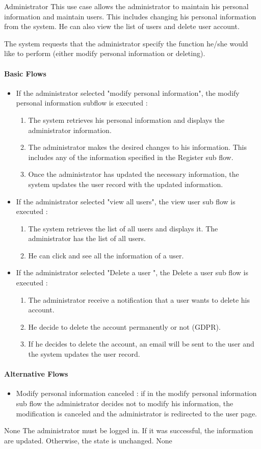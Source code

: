 \subusecasedesc
{Administrator}
{
  This use case allows the administrator to maintain his personal information and maintain users. This includes changing his personal information from the system. He can also view the list of users and delete user account.
}
{
  The system requests that the administrator specify the function he/she would like to perform (either modify personal information or deleting).

  \paragraph{Basic Flows}
  \begin{itemize}
    \item If the administrator selected "modify personal information", the modify personal information subflow is executed :
    \begin{enumerate}
      \item The system retrieves his personal information and displays the administrator information.
      \item The administrator makes the desired changes to his information. This includes any of the information specified in the Register sub flow.
      \item Once the administrator has updated the necessary information, the system updates the user record with the updated information.
    \end{enumerate}
    \item If the administrator selected "view all users", the view user sub flow is executed :
    \begin{enumerate}
      \item The system retrieves the list of all users and displays it. The administrator has the list of all users.
      \item He can click and see all the information of a user.
    \end{enumerate}
    \item If the administrator selected "Delete a user ", the Delete a user sub flow is executed :
    \begin{enumerate}
      \item The administrator receive a notification that a user wants to delete his account.
      \item He decide to delete the account permanently or not (GDPR).
      \item If he decides to delete the account, an email will be sent to the user and the system updates the user record.
    \end{enumerate}

  \end{itemize}
  \paragraph{Alternative Flows}
  \begin{itemize}
    \item Modify personal information canceled : if in the modify personal information sub flow the administrator decides not to modify his information, the modification is canceled and the administrator is redirected to the user page.
  \end{itemize}

}
{None}
{The administrator must be logged in.}
{
  If it was successful, the information are updated. Otherwise, the state is unchanged.
}
{None}